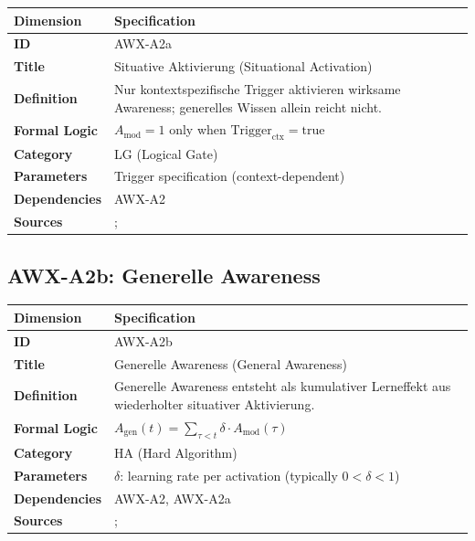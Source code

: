 \begin{table}[htbp]
\small
\begin{tabular}{p{3cm}p{11cm}}
\toprule
\textbf{Dimension} & \textbf{Specification} \\
\midrule
\textbf{ID} & AWX-A2a \\
\textbf{Title} & Situative Aktivierung (Situational Activation) \\
\textbf{Definition} & Nur kontextspezifische Trigger aktivieren wirksame Awareness; generelles Wissen allein reicht nicht. \\
\textbf{Formal Logic} & $A_{\text{mod}} = 1$ only when $\text{Trigger}_{\text{ctx}} = \text{true}$ \\
\textbf{Category} & LG (Logical Gate) \\
\textbf{Parameters} & Trigger specification (context-dependent) \\
\textbf{Dependencies} & AWX-A2 \\
\textbf{Sources} & \citet{PAP-tversky1981framing}; \citet{PAP-PAP-thaler1980towardtoward} \\
\bottomrule
\end{tabular}
\end{table}


\subsection{AWX-A2b: Generelle Awareness}

\begin{table}[htbp]
\small
\begin{tabular}{p{3cm}p{11cm}}
\toprule
\textbf{Dimension} & \textbf{Specification} \\
\midrule
\textbf{ID} & AWX-A2b \\
\textbf{Title} & Generelle Awareness (General Awareness) \\
\textbf{Definition} & Generelle Awareness entsteht als kumulativer Lerneffekt aus wiederholter situativer Aktivierung. \\
\textbf{Formal Logic} & $A_{\text{gen}}(t) = \sum_{\tau < t} \delta \cdot A_{\text{mod}}(\tau)$ \\
\textbf{Category} & HA (Hard Algorithm) \\
\textbf{Parameters} & $\delta$: learning rate per activation (typically $0 < \delta < 1$) \\
\textbf{Dependencies} & AWX-A2, AWX-A2a \\
\textbf{Sources} & \citet{arrow1962learning}; \citet{kandori1993learning} \\
\bottomrule
\end{tabular}
\end{table}

